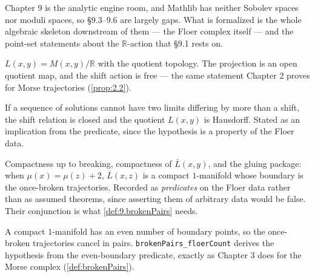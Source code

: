 Chapter 9 is the analytic engine room, and Mathlib has neither Sobolev spaces
nor moduli spaces, so \S9.3--9.6 are largely gaps.  What is formalized is the
whole algebraic skeleton downstream of them --- the Floer complex itself --- and
the point-set statements about the $\mathbb{R}$-action that \S9.1 rests on.

\begin{definition}
  \label{def:9.1.a}
  \leanok
  $L(x,y) = M(x,y)/\mathbb{R}$ with the quotient topology.  The projection is an
  open quotient map, and the shift action is free --- the same statement Chapter
  2 proves for Morse trajectories (\ref{prop:2.2}).
\end{definition}

\begin{corollary}
  \label{cor:9.1.3}
  \leanok
  If a sequence of solutions cannot have two limits differing by more than a
  shift, the shift relation is closed and the quotient $L(x,y)$ is Hausdorff.
  Stated as an implication from the predicate, since the hypothesis is a
  property of the Floer data.
\end{corollary}

\begin{theorem}
  \label{thm:9.2.1}
  \notready
  Compactness up to breaking, compactness of $\bar L(x,y)$, and the gluing
  package: when $\mu(x) = \mu(z)+2$, $\bar L(x,z)$ is a compact $1$-manifold
  whose boundary is the once-broken trajectories.  Recorded as \emph{predicates}
  on the Floer data rather than as assumed theorems, since asserting them of
  arbitrary data would be false.  Their conjunction is what
  \ref{def:9.brokenPairs} needs.
\end{theorem}

\begin{definition}[The broken-trajectory hypothesis, and $\partial\circ\partial=0$]
  \label{def:9.brokenPairs}
  \leanok
  A compact $1$-manifold has an even number of boundary points, so the
  once-broken trajectories cancel in pairs.  \texttt{brokenPairs\_floerCount}
  derives the hypothesis from the even-boundary predicate, exactly as Chapter 3
  does for the Morse complex (\ref{def:brokenPairs}).
\end{definition}

